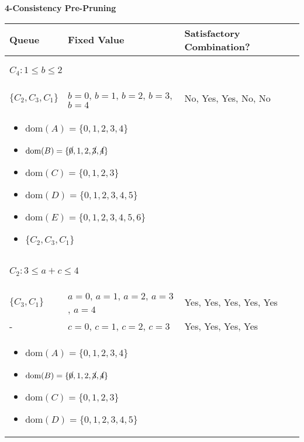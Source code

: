 \begin{example} \textbf{4-Consistency Pre-Pruning}
    \begin{center}
        \begin{tabular}{lll}
            \textbf{Queue} & \textbf{Fixed Value} & \textbf{Satisfactory Combination?} \\
            \toprule
            \multicolumn{3}{p{\linewidth}}{
            \begin{center}
                $C_4: 1 \leq b \leq 2$
            \end{center}} \\
            $\{C_2, C_3, C_1\}$    & $b = 0$, $b=1$, $b=2$, $b=3$, $b=4$ & No, Yes, Yes, No, No \\
            \multicolumn{3}{p{\linewidth}}{
            \begin{itemize}
                \item $\text{dom}(A) = \{0, 1, 2, 3, 4\}$
                \item $\text{dom}(B) = \{\cancel{0}, 1, 2, \cancel{3}, \cancel{4}\} $
                \item $\text{dom}(C) = \{0, 1, 2, 3\} $
                \item $\text{dom}(D) = \{0, 1, 2, 3, 4, 5\} $
                \item $\text{dom}(E) = \{0, 1, 2, 3, 4, 5, 6\} $
                \item $\{C_2, C_3, C_1\}$
            \end{itemize}} \\
            \midrule
            \multicolumn{3}{p{\linewidth}}{
            \begin{center}
                $C_2: 3 \leq a + c \leq 4$
            \end{center}} \\
                $\{C_3, C_1\}$ & $a=0$, $a=1$, $a=2$, $a=3$, $a=4$ & Yes, Yes, Yes, Yes, Yes \\
                - & $c=0$, $c=1$, $c=2$, $c=3$ & Yes, Yes, Yes, Yes \\
            \multicolumn{3}{p{\linewidth}}{
            \begin{itemize}
                \item $\text{dom}(A) = \{0, 1, 2, 3, 4\}$
                \item $\text{dom}(B) = \{\cancel{0}, 1, 2, \cancel{3}, \cancel{4}\} $
                \item $\text{dom}(C) = \{0, 1, 2, 3\} $
                \item $\text{dom}(D) = \{0, 1, 2, 3, 4, 5\} $

\end{itemize}}
\end{tabular}
\end{center}
\end{example}
